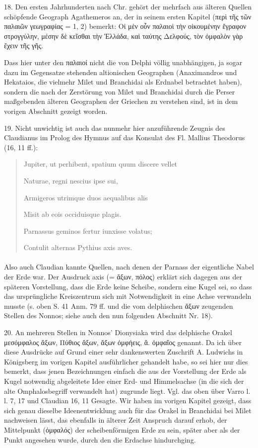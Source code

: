\documentclass[a4paper, 11pt, oneside]{article}
\begin{document}
18. Den ersten Jahrhunderten nach Chr. gehört der mehrfach aus älteren Quellen schöpfende Geograph Agathemeros an, der in seinem ersten Kapitel (περὶ τῆς τῶν παλαιῶν γεωγραφίας = 1, 2) bemerkt: Οἱ μὲν οὖν παλαιοὶ τὴν οἰκουμένην ἔγραφον στρογγύλην, μέσην δὲ κεῖσθαι τὴν Ἑλλάδα, καὶ ταύτης Δελφούς, τὸν ὀμφαλὸν γὰρ ἔχειν τῆς γῆς.

Dass hier unter den παλαιοί nicht die von Delphi völlig unabhängigen, ja sogar dazu im Gegensatze stehenden altionischen Geographen (Anaximandros und Hekataios, die vielmehr Milet und Branchidai als Erdnabel betrachtet haben), sondern die nach der Zerstörung von Milet und Branchidai durch die Perser maßgebenden älteren Geographen der Griechen zu verstehen sind, ist in dem vorigen Abschnitt gezeigt worden.

19. Nicht unwichtig ist auch das nunmehr hier anzuführende Zeugnis des Claudianus im Prolog des Hymnus auf das Konsulat des Fl. Mallius Theodorus (16, 11 ff.):
\begin{quotation}
Jupiter, ut perhibent, spatium quum discere vellet

\hspace*{5mm}Naturae, regni nescius ipse sui,

Armigeros utrimque duos aequalibus alis

\hspace*{5mm}Misit ab eois occiduisque plagis.

Parnassus geminos fertur iunxisse volatus;

\hspace*{5mm}Contulit alternas Pythius axis aves.
\end{quotation}
\paragraph{}
Also auch Claudian kannte Quellen, nach denen der Parnass der eigentliche Nabel der Erde war. Der Ausdruck axis (= ἄξων, πόλος) erklärt sich dagegen aus der späteren Vorstellung, dass die Erde keine Scheibe, sondern eine Kugel sei, so dass das ursprüngliche Kreiszentrum sich mit Notwendigkeit in eine Achse verwandeln musste (s. oben S. 41 Anm. 79 ff. und die vom delphischen ἄξων zeugenden Stellen des Nonnos; siehe auch den nun folgenden Abschnitt Nr. 18).

20. An mehreren Stellen in Nonnos' Dionysiaka wird das delphische Orakel μεσόμφαλος ἄξων, Πύθιος ἄξων, ἄξων ὀμφήεις, ἄ. ὀμφαῖος genannt. Da ich über diese Ausdrücke auf Grund einer sehr dankenswerten Zuschrift A. Ludwichs in Königsberg im vorigen Kapitel ausführlicher gehandelt habe, so sei hier nur dies bemerkt, dass jenen Bezeichnungen einfach die aus der Vorstellung der Erde als Kugel notwendig abgeleitete Idee einer Erd- und Himmelsachse (in die sich der alte Omphalosbegriff verwandelt hat) zugrunde liegt. Vgl. das oben über Varro l. l. 7, 17 und Claudian 16, 11 Gesagte. Wir haben im vorigen Kapitel gezeigt, dass sich genau dieselbe Ideenentwicklung auch für das Orakel in Branchidai bei Milet nachweisen lässt, das ebenfalls in älterer Zeit Anspruch darauf erhob, der Mittelpunkt (ὀμφαλός) der scheibenförmigen Erde zu sein, später aber als der Punkt angesehen wurde, durch den die Erdachse hindurchging.
\end{document}
